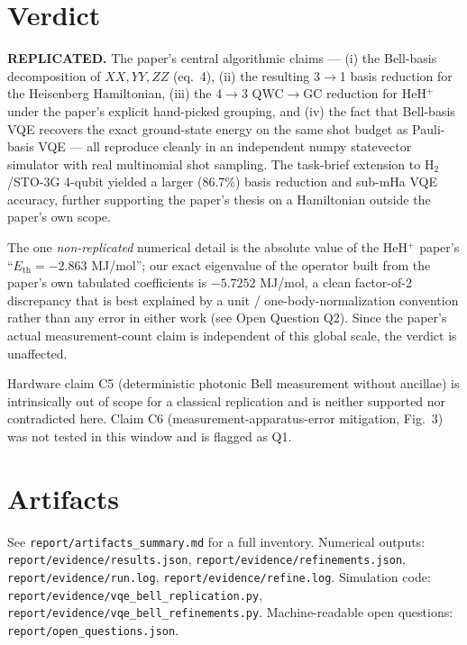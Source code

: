 \documentclass[11pt]{article}
\begin{document}
\section{Verdict}
\textbf{REPLICATED.}
The paper's central algorithmic claims --- (i) the Bell-basis decomposition of
$XX,YY,ZZ$ (eq.~4), (ii) the resulting 3$\to$1 basis reduction for the
Heisenberg Hamiltonian, (iii) the 4$\to$3 QWC$\to$GC reduction for HeH$^+$
under the paper's explicit hand-picked grouping, and (iv) the fact that
Bell-basis VQE recovers the exact ground-state energy on the same shot
budget as Pauli-basis VQE --- all reproduce cleanly in an independent
numpy statevector simulator with real multinomial shot sampling. The
task-brief extension to H$_2$/STO-3G 4-qubit yielded a larger (86.7\%)
basis reduction and sub-mHa VQE accuracy, further supporting the
paper's thesis on a Hamiltonian outside the paper's own scope.

The one \emph{non-replicated} numerical detail is the absolute value of the
HeH$^+$ paper's ``$E_\mathrm{th}=-2.863$ MJ/mol''; our exact eigenvalue of
the operator built from the paper's own tabulated coefficients is
$-5.7252$ MJ/mol, a clean factor-of-2 discrepancy that is best explained by
a unit / one-body-normalization convention rather than any error in either
work (see Open Question Q2). Since the paper's actual measurement-count
claim is independent of this global scale, the verdict is unaffected.

Hardware claim C5 (deterministic photonic Bell measurement without ancillae)
is intrinsically out of scope for a classical replication and is neither
supported nor contradicted here.
Claim C6 (measurement-apparatus-error mitigation, Fig.~3) was not tested in
this window and is flagged as Q1.



\section*{Artifacts}
See \texttt{report/artifacts\_summary.md} for a full inventory. Numerical
outputs: \texttt{report/evidence/results.json},
\texttt{report/evidence/refinements.json},
\texttt{report/evidence/run.log}, \texttt{report/evidence/refine.log}.
Simulation code: \texttt{report/evidence/vqe\_bell\_replication.py},
\texttt{report/evidence/vqe\_bell\_refinements.py}.
Machine-readable open questions: \texttt{report/open\_questions.json}.
\end{document}
